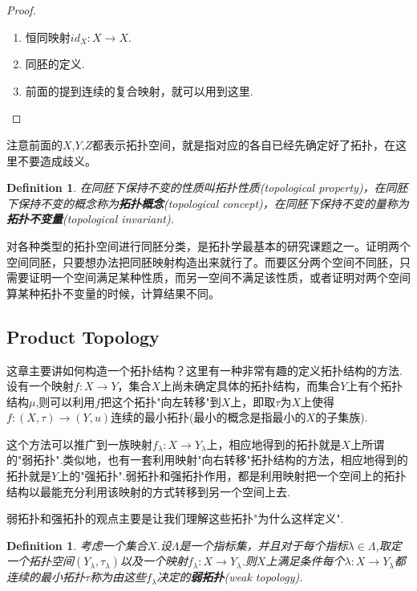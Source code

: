 \documentclass{article}
\newtheorem{definition}[theorem]{Definition}
\newcommand*{\xfunc}[4]{{#2}\colon{#3}{#1}{#4}}
\newcommand*{\func}[3]{\xfunc{\to}{#1}{#2}{#3}}
\begin{document}
\begin{proof}
\begin{enumerate}
	\item 恒同映射$\func{id_X}{X}{X}$.
	\item 同胚的定义.
	\item 前面的提到连续的复合映射，就可以用到这里.
\end{enumerate}
\end{proof}

注意前面的$X$,$Y$,$Z$都表示拓扑空间，就是指对应的各自已经先确定好了拓扑，在这里不要造成歧义。

\begin{definition}
在同胚下保持不变的性质叫拓扑性质(topological property)，在同胚下保持不变的概念称为\textbf{拓扑概念}(topological concept)，在同胚下保持不变的量称为\textbf{拓扑不变量}(topological invariant).
\end{definition}

对各种类型的拓扑空间进行同胚分类，是拓扑学最基本的研究课题之一。证明两个空间同胚，只要想办法把同胚映射构造出来就行了。而要区分两个空间不同胚，只需要证明一个空间满足某种性质，而另一空间不满足该性质，或者证明对两个空间算某种拓扑不变量的时候，计算结果不同。


\newpage
\subsection{Product Topology}
这章主要讲如何构造一个拓扑结构？这里有一种非常有趣的定义拓扑结构的方法.设有一个映射$\func{f}{X}{Y}$，集合$X$上尚未确定具体的拓扑结构，而集合$Y$上有个拓扑结构$\mu$,则可以利用$f$把这个拓扑"向左转移"到$X$上，即取$\tau$为$X$上使得$\func{f}{(X,\tau)}{(Y,u)}$连续的最小拓扑(最小的概念是指最小的$X$的子集族).

这个方法可以推广到一族映射$\func{f_\lambda}{X}{Y_\lambda}$上，相应地得到的拓扑就是$X$上所谓的"弱拓扑".类似地，也有一套利用映射"向右转移"拓扑结构的方法，相应地得到的拓扑就是$Y$上的"强拓扑".弱拓扑和强拓扑作用，都是利用映射把一个空间上的拓扑结构以最能充分利用该映射的方式转移到另一个空间上去.

弱拓扑和强拓扑的观点主要是让我们理解这些拓扑"为什么这样定义".


\begin{definition}
考虑一个集合$X$.设$\Lambda$是一个指标集，并且对于每个指标$\lambda \in \Lambda$,取定一个拓扑空间$(Y_\lambda,\tau_\lambda)$以及一个映射$\func{f_\lambda}{X}{Y_\lambda}$.则$X$上满足条件每个$\func{\lambda}{X}{Y_\lambda}$都连续的最小拓扑$\tau$称为由这些$f_\lambda$决定的\textbf{弱拓扑}(weak topology).
\end{definition}
\end{document}
